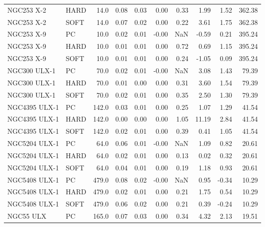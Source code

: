 \begin{tabular}{llrrrrrrrr}
        NGC253 X-2 &  HARD &   14.0 &  0.08 & 0.03 &      0.00 &   0.33 &      1.99 &  1.52 &       362.38 \\
        NGC253 X-2 &  SOFT &   14.0 &  0.07 & 0.02 &      0.00 &   0.22 &      3.61 &  1.75 &       362.38 \\
        NGC253 X-9 &    PC &   10.0 &  0.02 & 0.01 &     -0.00 &    NaN &     -0.59 &  0.21 &       395.24 \\
        NGC253 X-9 &  HARD &   10.0 &  0.01 & 0.01 &      0.00 &   0.72 &      0.69 &  1.15 &       395.24 \\
        NGC253 X-9 &  SOFT &   10.0 &  0.01 & 0.01 &      0.00 &   0.24 &     -1.05 &  0.09 &       395.24 \\
      NGC300 ULX-1 &    PC &   70.0 &  0.02 & 0.01 &     -0.00 &    NaN &      3.08 &  1.43 &        79.39 \\
      NGC300 ULX-1 &  HARD &   70.0 &  0.01 & 0.00 &      0.00 &   0.31 &      3.60 &  1.54 &        79.39 \\
      NGC300 ULX-1 &  SOFT &   70.0 &  0.02 & 0.01 &      0.00 &   0.35 &      2.50 &  1.30 &        79.39 \\
     NGC4395 ULX-1 &    PC &  142.0 &  0.03 & 0.01 &      0.00 &   0.25 &      1.07 &  1.29 &        41.54 \\
     NGC4395 ULX-1 &  HARD &  142.0 &  0.00 & 0.00 &      0.00 &   1.05 &     11.19 &  2.84 &        41.54 \\
     NGC4395 ULX-1 &  SOFT &  142.0 &  0.02 & 0.01 &      0.00 &   0.39 &      0.41 &  1.05 &        41.54 \\
     NGC5204 ULX-1 &    PC &   64.0 &  0.06 & 0.01 &     -0.00 &    NaN &      1.09 &  0.82 &        20.61 \\
     NGC5204 ULX-1 &  HARD &   64.0 &  0.02 & 0.01 &      0.00 &   0.13 &      0.02 &  0.32 &        20.61 \\
     NGC5204 ULX-1 &  SOFT &   64.0 &  0.04 & 0.01 &      0.00 &   0.19 &      1.18 &  0.93 &        20.61 \\
     NGC5408 ULX-1 &    PC &  479.0 &  0.08 & 0.02 &     -0.00 &    NaN &      0.95 & -0.34 &        10.29 \\
     NGC5408 ULX-1 &  HARD &  479.0 &  0.02 & 0.01 &      0.00 &   0.21 &      1.75 &  0.54 &        10.29 \\
     NGC5408 ULX-1 &  SOFT &  479.0 &  0.06 & 0.02 &      0.00 &   0.21 &      0.39 & -0.24 &        10.29 \\
         NGC55 ULX &    PC &  165.0 &  0.07 & 0.03 &      0.00 &   0.34 &      4.32 &  2.13 &        19.51 \\

\end{tabular}
